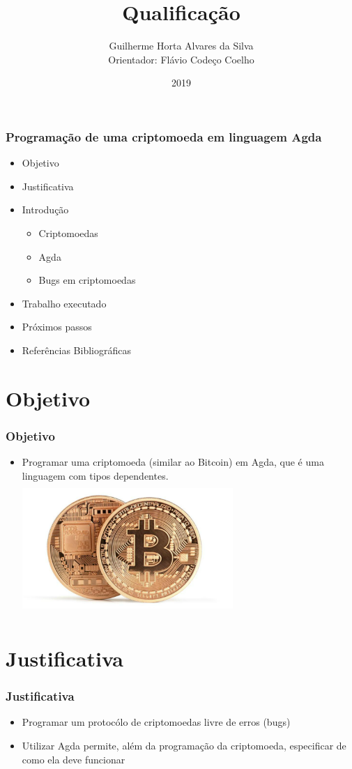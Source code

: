 \documentclass{beamer}
\title{Qualificação}
\author[Guilherme, Flávio]{Guilherme Horta Alvares da Silva \\
  Orientador: Flávio Codeço Coelho}
\institute{Fundação Getulio Vargas}
\date{2019}
\begin{document}
 
\frame{\titlepage}

\begin{frame}
  \frametitle{Programação de uma criptomoeda em linguagem Agda}
\begin{itemize}
  \item Objetivo
  \item Justificativa
  \item Introdução
  \begin{itemize}
    \item Criptomoedas
    \item Agda
    \item Bugs em criptomoedas
  \end{itemize}
  \item Trabalho executado
  \item Próximos passos
  \item Referências Bibliográficas
\end{itemize}
\end{frame}

\section{Objetivo}

 \begin{frame}
\frametitle{Objetivo}
\begin{itemize}
  \item Programar uma criptomoeda (similar ao Bitcoin) em Agda, que é uma linguagem com tipos dependentes.
    \includegraphics[width=8cm, height=5cm]{TwoBitcoins}
\end{itemize}
\end{frame}
 
\section{Justificativa}

 \begin{frame}
\frametitle{Justificativa}
\begin{itemize}
    \item Programar um protocólo de criptomoedas livre de erros (bugs)
    \item Utilizar Agda permite, além da programação da criptomoeda, especificar de como ela deve funcionar 
\end{itemize}
\end{frame}
\end{document}
